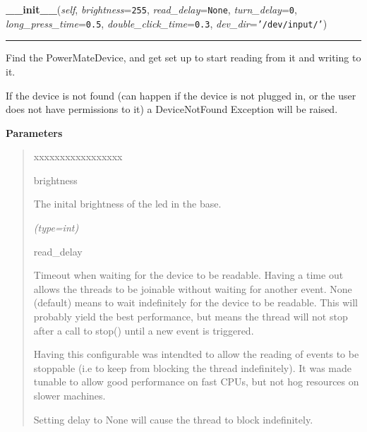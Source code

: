 \hspace{.8\funcindent}\begin{boxedminipage}{\funcwidth}

    \raggedright \textbf{\_\_init\_\_}(\textit{self}, \textit{brightness}={\tt 255}, \textit{read\_delay}={\tt None}, \textit{turn\_delay}={\tt 0}, \textit{long\_press\_time}={\tt 0.5}, \textit{double\_click\_time}={\tt 0.3}, \textit{dev\_dir}={\tt \texttt{'}\texttt{/dev/input/}\texttt{'}})

    \vspace{-1.5ex}

    \rule{\textwidth}{0.5\fboxrule}
\setlength{\parskip}{2ex}
    Find the PowerMateDevice, and get set up to start reading from it and 
    writing to it.

    If the device is not found (can happen if the device is not plugged in,
    or the user does not have permissions to it) a DeviceNotFound Exception
    will be raised.

\setlength{\parskip}{1ex}
      \textbf{Parameters}
      \vspace{-1ex}

      \begin{quote}
        \begin{Ventry}{xxxxxxxxxxxxxxxxx}

          \item[brightness]

          The inital brightness of the led in the base.

            {\it (type=int)}

          \item[read\_delay]

          Timeout when waiting for the device to be readable. Having a time
          out allows the threads to be joinable without waiting for another
          event. None (default) means to wait indefinitely for the device 
          to be readable. This will probably yield the best performance, 
          but means the thread will not stop after a call to stop() until a
          new event is triggered.

          Having this configurable  was intendted to allow the reading of 
          events to be stoppable (i.e to keep from blocking the thread 
          indefinitely). It was made tunable to allow good performance on 
          fast CPUs, but not hog resources on slower machines.

          Setting delay to None will cause the thread to block 
          indefinitely.


\end{Ventry}
\end{quote}
\end{boxedminipage}
